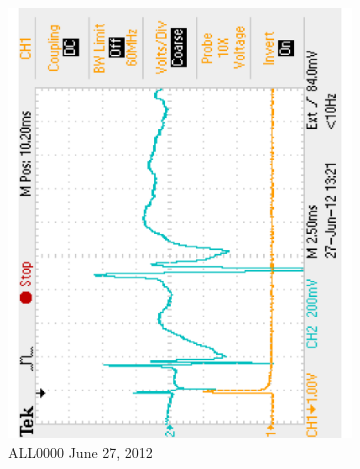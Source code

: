 \begin{figure}[H]
	\centering 
	\begin{singlespace}
	\begin{subfigure}[b]{0.48\textwidth}
		\centering 
		\includegraphics[trim=0 0.1in 0 0.1in,clip,angle=-90,width=\textwidth]{./figures/F0000TEK_abnorm_120627} %
	\caption{ALL0000 June 27, 2012}
	\end{subfigure}
	~
	\begin{subfigure}[b]{0.48\textwidth}
		\centering 

\end{subfigure}
\end{singlespace}
\end{figure}

